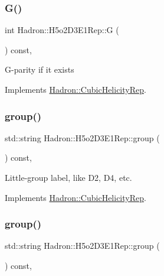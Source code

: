 \subsubsection{\texorpdfstring{G()}{G()}\hspace{0.1cm}{\footnotesize\ttfamily [3/3]}}
{\footnotesize\ttfamily int Hadron\+::\+H5o2\+D3\+E1\+Rep\+::G (\begin{DoxyParamCaption}{ }\end{DoxyParamCaption}) const\hspace{0.3cm}{\ttfamily [inline]}, {\ttfamily [virtual]}}

G-\/parity if it exists 

Implements \mbox{\hyperlink{structHadron_1_1CubicHelicityRep_a50689f42be1e6170aa8cf6ad0597018b}{Hadron\+::\+Cubic\+Helicity\+Rep}}.

\mbox{\label{structHadron_1_1H5o2D3E1Rep_a80104355e2d046afbfe385b15b96b79a}} 
\subsubsection{\texorpdfstring{group()}{group()}\hspace{0.1cm}{\footnotesize\ttfamily [1/5]}}
{\footnotesize\ttfamily std\+::string Hadron\+::\+H5o2\+D3\+E1\+Rep\+::group (\begin{DoxyParamCaption}{ }\end{DoxyParamCaption}) const\hspace{0.3cm}{\ttfamily [inline]}, {\ttfamily [virtual]}}

Little-\/group label, like D2, D4, etc. 

Implements \mbox{\hyperlink{structHadron_1_1CubicHelicityRep_a101a7d76cd8ccdad0f272db44b766113}{Hadron\+::\+Cubic\+Helicity\+Rep}}.

\mbox{\label{structHadron_1_1H5o2D3E1Rep_a80104355e2d046afbfe385b15b96b79a}} 
\subsubsection{\texorpdfstring{group()}{group()}\hspace{0.1cm}{\footnotesize\ttfamily [2/5]}}
{\footnotesize\ttfamily std\+::string Hadron\+::\+H5o2\+D3\+E1\+Rep\+::group (\begin{DoxyParamCaption}{ }\end{DoxyParamCaption}) const\hspace{0.3cm}{\ttfamily [inline]}, {\ttfamily [virtual]}}


